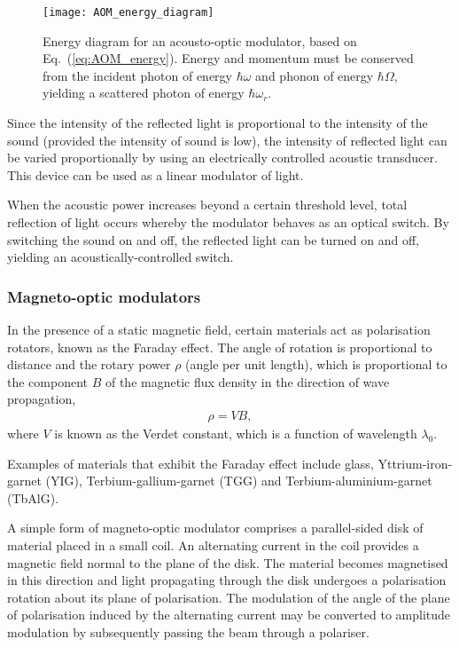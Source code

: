 \begin{figure}[!htbp]
\texttt{[image: AOM\_energy\_diagram]}
\captionspacefig \caption{Energy diagram for an acousto-optic modulator, based on Eq.~(\ref{eq:AOM_energy}). Energy and momentum must be conserved from the incident photon of energy $\hbar\omega$ and phonon of energy $\hbar\Omega$, yielding a scattered photon of energy $\hbar\omega_r$.}\label{fig:AOM_energy_diagram}
\end{figure}

Since the intensity of the reflected light is proportional to the intensity of the sound (provided the intensity of sound is low), the intensity of reflected light can be varied proportionally by using an electrically controlled acoustic transducer. This device can be used as a linear modulator of light.

When the acoustic power increases beyond a certain threshold level, total reflection of light occurs whereby the modulator behaves as an optical switch. By switching the sound on and off, the reflected light can be turned on and off, yielding an acoustically-controlled switch.

%
%

\subsubsection{Magneto-optic modulators} 

In the presence of a static magnetic field, certain materials act as polarisation rotators, known as the Faraday effect. The angle of rotation is proportional to distance and the rotary power $\rho$ (angle per unit length), which is proportional to the component $B$ of the magnetic flux density in the direction of wave propagation,
\begin{align}
	\rho=VB,
\end{align}
where $V$ is known as the Verdet constant, which is a function of wavelength $\lambda_0$.
 
Examples of materials that exhibit the Faraday effect include glass, Yttrium-iron-garnet (YIG), Terbium-gallium-garnet (TGG) and Terbium-aluminium-garnet (TbAlG).

A simple form of magneto-optic modulator comprises a parallel-sided disk of material placed in a small coil. An alternating current in the coil provides a magnetic field normal to the plane of the disk. The material becomes magnetised in this direction and light propagating through the disk undergoes a polarisation rotation about its plane of polarisation. The modulation of the angle of the plane of polarisation induced by the alternating current may be converted to amplitude modulation by subsequently passing the beam through a polariser. 

